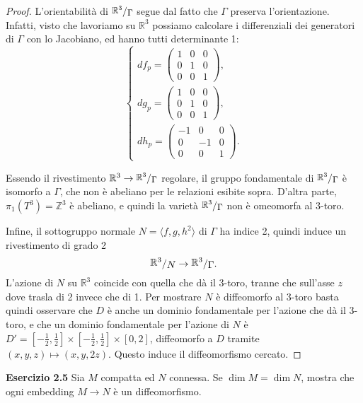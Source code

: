 \documentclass[a4paper]{article}
\newcommand{\R}{\mathbb{R}}
\newcommand{\Z}{\mathbb{Z}}
\newcommand{\ssfrac}[2]{
    \raisebox{+0.3ex}{$#1$}
    /
    \raisebox{-0.3ex}{$#2$}
}
\newcommand{\sfrac}[2]{
    \raisebox{+0.3ex}{\scalebox{0.9}{$#1$}}
    /
    \raisebox{-0.3ex}{\scalebox{0.9}{$#2$}}
}
\theoremstyle{definition}
\theoremstyle{definition}
\theoremstyle{remark}
\theoremstyle{definition}
\begin{document}
\begin{proof}
    L'orientabilità di $\sfrac{\R^3}{\Gamma}$ segue dal fatto che $\Gamma$ preserva l'orientazione. Infatti, visto che lavoriamo su $\R^3$ possiamo calcolare i differenziali dei generatori di $\Gamma$ con lo Jacobiano, ed hanno tutti determinante 1:
    \[
        \begin{cases}
            df_p = \begin{pmatrix}
                1 & 0 & 0 \\
                0 & 1 & 0 \\
                0 & 0 & 1
            \end{pmatrix}, \\
            dg_p = \begin{pmatrix}
                1 & 0 & 0 \\
                0 & 1 & 0 \\
                0 & 0 & 1
            \end{pmatrix}, \\
            dh_p = \begin{pmatrix}
                -1 & 0 & 0 \\
                0  & -1 & 0 \\
                0  & 0  & 1
            \end{pmatrix}.
        \end{cases}
    \]

    Essendo il rivestimento $\R^3 \to \sfrac{\R^3}{\Gamma}$ regolare, il gruppo fondamentale di $\sfrac{\R^3}{\Gamma}$ è isomorfo a $\Gamma$, che non è abeliano per le relazioni esibite sopra. D'altra parte, $\pi_1(T^3) = \Z^3$ è abeliano, e quindi la varietà $\sfrac{\R^3}{\Gamma}$ non è omeomorfa al 3-toro.

    Infine, il sottogruppo normale $N=\langle f,g,h^2 \rangle$ di $\Gamma$ ha indice 2, quindi induce un rivestimento di grado 2
    \[
        \ssfrac{\R^3}{N} \to \ssfrac{\R^3}{\Gamma}.
    \]
    L'azione di $N$ su $\R^3$ coincide con quella che dà il 3-toro, tranne che sull'asse $z$ dove trasla di 2 invece che di 1. Per mostrare $N$ è diffeomorfo al 3-toro basta quindi
    osservare che $D$ è anche un dominio fondamentale per l'azione che dà il 3-toro, e che un dominio fondamentale per l'azione di $N$ è $D' = [-\frac{1}{2},\frac{1}{2}]\times [-\frac{1}{2},\frac{1}{2}]\times[0,2]$, diffeomorfo a $D$ tramite
    $(x,y,z)\mapsto (x,y,2z)$. Questo induce il diffeomorfismo cercato.
\end{proof}
\textbf{Esercizio 2.5}
Sia $M$ compatta ed $N$ connessa. Se $\dim M = \dim N$, mostra che ogni embedding $M\to N$ è un diffeomorfismo.
\end{document}

